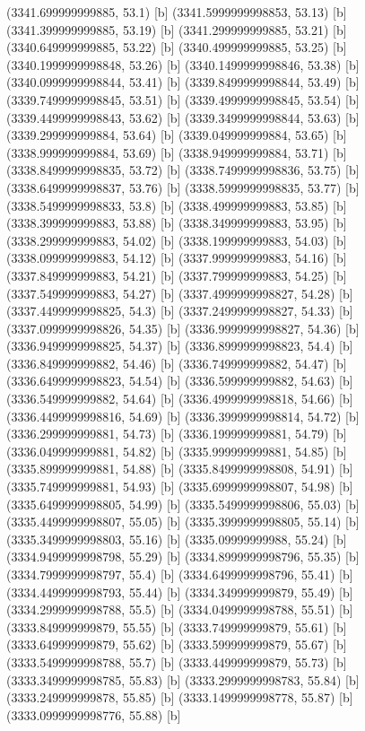 {{{(3341.699999999885, 53.1) [b] 
(3341.5999999998853, 53.13) [b] 
(3341.399999999885, 53.19) [b] 
(3341.299999999885, 53.21) [b] 
(3340.649999999885, 53.22) [b] 
(3340.499999999885, 53.25) [b] 
(3340.1999999998848, 53.26) [b] 
(3340.1499999998846, 53.38) [b] 
(3340.0999999998844, 53.41) [b] 
(3339.8499999998844, 53.49) [b] 
(3339.7499999998845, 53.51) [b] 
(3339.4999999998845, 53.54) [b] 
(3339.4499999998843, 53.62) [b] 
(3339.3499999998844, 53.63) [b] 
(3339.299999999884, 53.64) [b] 
(3339.049999999884, 53.65) [b] 
(3338.999999999884, 53.69) [b] 
(3338.949999999884, 53.71) [b] 
(3338.8499999998835, 53.72) [b] 
(3338.7499999998836, 53.75) [b] 
(3338.6499999998837, 53.76) [b] 
(3338.5999999998835, 53.77) [b] 
(3338.5499999998833, 53.8) [b] 
(3338.499999999883, 53.85) [b] 
(3338.399999999883, 53.88) [b] 
(3338.349999999883, 53.95) [b] 
(3338.299999999883, 54.02) [b] 
(3338.199999999883, 54.03) [b] 
(3338.099999999883, 54.12) [b] 
(3337.999999999883, 54.16) [b] 
(3337.849999999883, 54.21) [b] 
(3337.799999999883, 54.25) [b] 
(3337.549999999883, 54.27) [b] 
(3337.4999999998827, 54.28) [b] 
(3337.4499999998825, 54.3) [b] 
(3337.2499999998827, 54.33) [b] 
(3337.0999999998826, 54.35) [b] 
(3336.9999999998827, 54.36) [b] 
(3336.9499999998825, 54.37) [b] 
(3336.8999999998823, 54.4) [b] 
(3336.849999999882, 54.46) [b] 
(3336.749999999882, 54.47) [b] 
(3336.6499999998823, 54.54) [b] 
(3336.599999999882, 54.63) [b] 
(3336.549999999882, 54.64) [b] 
(3336.4999999998818, 54.66) [b] 
(3336.4499999998816, 54.69) [b] 
(3336.3999999998814, 54.72) [b] 
(3336.299999999881, 54.73) [b] 
(3336.199999999881, 54.79) [b] 
(3336.049999999881, 54.82) [b] 
(3335.999999999881, 54.85) [b] 
(3335.899999999881, 54.88) [b] 
(3335.8499999998808, 54.91) [b] 
(3335.749999999881, 54.93) [b] 
(3335.6999999998807, 54.98) [b] 
(3335.6499999998805, 54.99) [b] 
(3335.5499999998806, 55.03) [b] 
(3335.4499999998807, 55.05) [b] 
(3335.3999999998805, 55.14) [b] 
(3335.3499999998803, 55.16) [b] 
(3335.09999999988, 55.24) [b] 
(3334.9499999998798, 55.29) [b] 
(3334.8999999998796, 55.35) [b] 
(3334.7999999998797, 55.4) [b] 
(3334.6499999998796, 55.41) [b] 
(3334.4499999998793, 55.44) [b] 
(3334.349999999879, 55.49) [b] 
(3334.2999999998788, 55.5) [b] 
(3334.0499999998788, 55.51) [b] 
(3333.849999999879, 55.55) [b] 
(3333.749999999879, 55.61) [b] 
(3333.649999999879, 55.62) [b] 
(3333.599999999879, 55.67) [b] 
(3333.5499999998788, 55.7) [b] 
(3333.449999999879, 55.73) [b] 
(3333.3499999998785, 55.83) [b] 
(3333.2999999998783, 55.84) [b] 
(3333.249999999878, 55.85) [b] 
(3333.1499999998778, 55.87) [b] 
(3333.0999999998776, 55.88) [b] 
}}}

